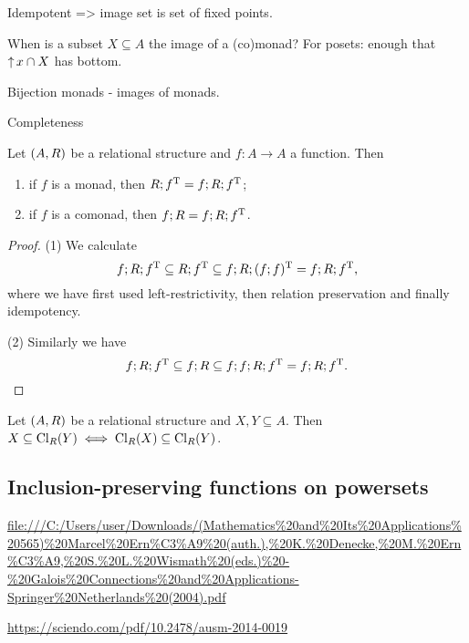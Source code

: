 Idempotent => image set is set of fixed points.

\begin{proposition}
When is a subset $X\subseteq A$ the image of a (co)monad? For posets: enough that $\operatorname{\uparrow} x \cap X$ has bottom.
\end{proposition}

\begin{proposition}
Bijection monads - images of monads.
\end{proposition}

\begin{definition}
Completeness
\end{definition}

\begin{proposition}
Let $\sSet{A,R}$ be a relational structure and $f: A\to A$ a function. Then
\begin{enumerate}
\item if $f$ is a monad, then $R; f^{\mathrm{T}} = f;R;f^{\mathrm{T}}$;
\item if $f$ is a comonad, then $f;R = f;R;f^{\mathrm{T}}$.
\end{enumerate}
\end{proposition}
\begin{proof}
(1) We calculate
\[ f;R;f^{\mathrm{T}} \subseteq R;f^{\mathrm{T}} \subseteq f;R;(f;f)^{\mathrm{T}} = f;R;f^{\mathrm{T}}, \]
where we have first used left-restrictivity, then relation preservation and finally idempotency.

(2) Similarly we have
\[ f;R;f^{\mathrm{T}} \subseteq f;R \subseteq f;f;R;f^{\mathrm{T}} = f;R;f^{\mathrm{T}}. \]
\end{proof}
\begin{corollary} \label{closureInclusionLemma}
Let $\sSet{A,R}$ be a relational structure and $X,Y\subseteq A$. Then $X\subseteq \operatorname{Cl}_R(Y) \iff \operatorname{Cl}_R(X)\subseteq \operatorname{Cl}_R(Y)$.
\end{corollary}

\subsection{Inclusion-preserving functions on powersets}
\url{file:///C:/Users/user/Downloads/(Mathematics%20and%20Its%20Applications%20565)%20Marcel%20Ern%C3%A9%20(auth.),%20K.%20Denecke,%20M.%20Ern%C3%A9,%20S.%20L.%20Wismath%20(eds.)%20-%20Galois%20Connections%20and%20Applications-Springer%20Netherlands%20(2004).pdf}

\url{https://sciendo.com/pdf/10.2478/ausm-2014-0019}

